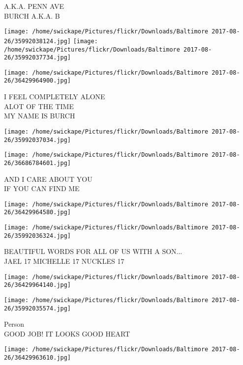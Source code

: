 \documentclass[10pt,letterpaper]{article}
\begin{document}
A.K.A. PENN AVE\\
BURCH A.K.A. B\\
\pagebreak

\texttt{[image: /home/swickape/Pictures/flickr/Downloads/Baltimore 2017-08-26/35992038124.jpg]}
\texttt{[image: /home/swickape/Pictures/flickr/Downloads/Baltimore 2017-08-26/35992037734.jpg]}

\vspace{0.25in}
\texttt{[image: /home/swickape/Pictures/flickr/Downloads/Baltimore 2017-08-26/36429964900.jpg]}

I FEEL COMPLETELY ALONE\\
ALOT OF THE TIME\\
MY NAME IS BURCH\\
\pagebreak

\texttt{[image: /home/swickape/Pictures/flickr/Downloads/Baltimore 2017-08-26/35992037034.jpg]}

\vspace{0.25in}
\texttt{[image: /home/swickape/Pictures/flickr/Downloads/Baltimore 2017-08-26/36686784601.jpg]}

AND I CARE ABOUT YOU\\
IF YOU CAN FIND ME\\
\pagebreak

\texttt{[image: /home/swickape/Pictures/flickr/Downloads/Baltimore 2017-08-26/36429964580.jpg]}

\vspace{0.25in}
\texttt{[image: /home/swickape/Pictures/flickr/Downloads/Baltimore 2017-08-26/35992036324.jpg]}

BEAUTIFUL WORDS FOR ALL OF US WITH A SON...\\
JAEL 17 MICHELLE 17 NUCKLES 17\\
\pagebreak

\texttt{[image: /home/swickape/Pictures/flickr/Downloads/Baltimore 2017-08-26/36429964140.jpg]}

\vspace{0.25in}
\texttt{[image: /home/swickape/Pictures/flickr/Downloads/Baltimore 2017-08-26/35992035574.jpg]}

Person\\
GOOD JOB!  IT LOOKS GOOD HEART\\
\pagebreak

\texttt{[image: /home/swickape/Pictures/flickr/Downloads/Baltimore 2017-08-26/36429963610.jpg]}
\end{document}
